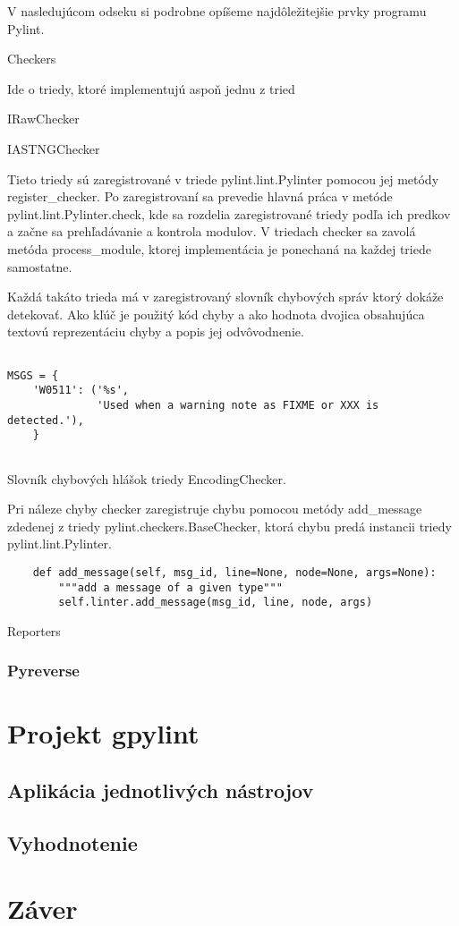 \documentclass[11pt,oneside,final]{fithesis2}
\begin{document}
		V nasledujúcom odseku si podrobne opíšeme najdôležitejšie prvky programu Pylint.
		
    \begin{list}{•}{}
		\item Checkers 
		
		Ide o triedy, ktoré implementujú aspoň jednu z tried
		
			    \begin{list}{•}{}
					\item IRawChecker
					\item IASTNGChecker
    			\end{list}		
		
		Tieto triedy sú zaregistrované v triede pylint.lint.Pylinter pomocou jej metódy register\_checker.	Po zaregistrovaní sa prevedie hlavná práca v metóde pylint.lint.Pylinter.check, kde sa rozdelia zaregistrované triedy podľa ich predkov a začne sa prehľadávanie a kontrola modulov. V triedach checker sa zavolá metóda process\_module, ktorej implementácia je ponechaná na každej triede samostatne.
		
		Každá takáto trieda má v zaregistrovaný slovník chybových správ ktorý dokáže detekovať. Ako kľúč je použitý kód chyby a ako hodnota dvojica obsahujúca textovú reprezentáciu chyby a popis jej odvôvodnenie.

\begin{lstlisting}

MSGS = {
    'W0511': ('%s',
              'Used when a warning note as FIXME or XXX is detected.'),
    }
		
\end{lstlisting}		

Slovník chybových hlášok triedy EncodingChecker.


Pri náleze chyby checker zaregistruje chybu pomocou metódy add\_message zdedenej z triedy pylint.checkers.BaseChecker, ktorá chybu predá instancii triedy pylint.lint.Pylinter.

\begin{lstlisting}
    def add_message(self, msg_id, line=None, node=None, args=None):
        """add a message of a given type"""
        self.linter.add_message(msg_id, line, node, args)
\end{lstlisting}

		
		\item Reporters
    \end{list}
		
	\subsection{Pyreverse}
	
	
	   
    
    
    
\chapter{Projekt gpylint}
	\section{Aplikácia jednotlivých nástrojov}
	\section{Vyhodnotenie}	

\chapter{Záver}
\end{document}

